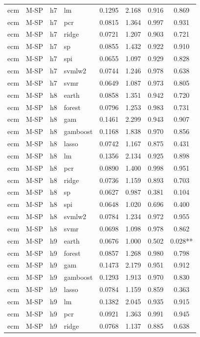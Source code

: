 \begin{ThreePartTable}
\begin{longtable}[t]{llclcccc}
ecm & M-SP & h7 & lm & 0.1295 & 2.168 & 0.916 & 0.869\\
ecm & M-SP & h7 & pcr & 0.0815 & 1.364 & 0.997 & 0.931\\
ecm & M-SP & h7 & ridge & 0.0721 & 1.207 & 0.903 & 0.721\\
ecm & M-SP & h7 & sp & 0.0855 & 1.432 & 0.922 & 0.910\\
ecm & M-SP & h7 & spi & 0.0655 & 1.097 & 0.929 & 0.828\\
ecm & M-SP & h7 & svmlw2 & 0.0744 & 1.246 & 0.978 & 0.638\\
ecm & M-SP & h7 & svmr & 0.0649 & 1.087 & 0.973 & 0.805\\
\addlinespace
ecm & M-SP & h8 & earth & 0.0858 & 1.351 & 0.942 & 0.720\\
ecm & M-SP & h8 & forest & 0.0796 & 1.253 & 0.983 & 0.731\\
ecm & M-SP & h8 & gam & 0.1461 & 2.299 & 0.943 & 0.907\\
ecm & M-SP & h8 & gamboost & 0.1168 & 1.838 & 0.970 & 0.856\\
ecm & M-SP & h8 & lasso & 0.0742 & 1.167 & 0.875 & 0.431\\
ecm & M-SP & h8 & lm & 0.1356 & 2.134 & 0.925 & 0.898\\
ecm & M-SP & h8 & pcr & 0.0890 & 1.400 & 0.998 & 0.951\\
ecm & M-SP & h8 & ridge & 0.0736 & 1.159 & 0.893 & 0.703\\
ecm & M-SP & h8 & sp & 0.0627 & 0.987 & 0.381 & 0.104\\
ecm & M-SP & h8 & spi & 0.0648 & 1.020 & 0.696 & 0.400\\
ecm & M-SP & h8 & svmlw2 & 0.0784 & 1.234 & 0.972 & 0.955\\
ecm & M-SP & h8 & svmr & 0.0698 & 1.098 & 0.978 & 0.862\\
\addlinespace
ecm & M-SP & h9 & earth & 0.0676 & 1.000 & 0.502 & 0.028**\\
ecm & M-SP & h9 & forest & 0.0857 & 1.268 & 0.980 & 0.798\\
ecm & M-SP & h9 & gam & 0.1473 & 2.179 & 0.951 & 0.912\\
ecm & M-SP & h9 & gamboost & 0.1293 & 1.913 & 0.970 & 0.830\\
ecm & M-SP & h9 & lasso & 0.0784 & 1.159 & 0.859 & 0.363\\
ecm & M-SP & h9 & lm & 0.1382 & 2.045 & 0.935 & 0.915\\
ecm & M-SP & h9 & pcr & 0.0921 & 1.363 & 0.991 & 0.945\\
ecm & M-SP & h9 & ridge & 0.0768 & 1.137 & 0.885 & 0.638\\

\end{longtable}
\end{ThreePartTable}
